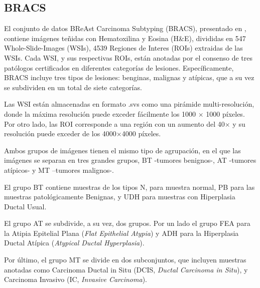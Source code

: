 \subsection{BRACS}

El conjunto de datos BReAst Carcinoma Subtyping (BRACS), presentado en \cite{brancati2021bracs}, contiene imágenes teñidas con Hematoxilina y Eosina (H\&E), divididas en 547 Whole-Slide-Images (WSIs), 4539 Regiones de Interes (ROIs) extraidas de las WSIs. Cada WSI, y sus respectivas ROIs, están anotadas por el consenso de tres patólogos certificados en diferentes categorías de lesiones. Específicamente, BRACS incluye tres tipos de lesiones: benginas, malignas y atípicas, que a su vez se subdividen en un total de siete categorías.

Las WSI están almacenadas en formato .svs como una pirámide multi-resolución, donde la máxima resolución puede exceder fácilmente los 1000 $\times$ 1000 píxeles. Por otro lado, las ROI corresponde a una región con un aumento del 40$\times$ y su resolución puede exceder de los 4000$\times$4000 píxeles.

Ambos grupos de imágenes tienen el mismo tipo de agrupación, en el que las imágenes se separan en tres grandes grupos, BT -tumores benignos-, AT -tumores atípicos- y MT --tumores malignos-. 

El grupo BT contiene muestras de los tipos N, para muestra normal, PB para las muestras patológicamente Benignas, y UDH para muestras con Hiperplasia Ductal Usual.

El grupo AT se subdivide, a su vez, dos grupos. Por un lado el grupo FEA para la Atipia Epitelial Plana (\textit{Flat Epithelial Atypia}) y ADH para la Hiperplasia Ductal Atípica (\textit{Atypical Ductal Hyperplasia}).

Por último, el grupo MT se divide en dos subconjuntos, que incluyen muestras anotadas como Carcinoma Ductal in Situ (DCIS,  \textit{Ductal Carcinoma in Situ}), y Carcinoma Invasivo (IC, \textit{Invasive Carcinoma}).



